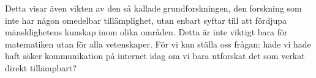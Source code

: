Detta visar även vikten av den så kallade grundforskningen, den forskning som 
inte har någon omedelbar tillämplighet, utan enbart syftar till att fördjupa 
mänsklighetens kunskap inom olika områden.
Detta är inte viktigt bara för matematiken utan för alla vetenskaper.
För vi kan ställa oss frågan: hade vi hade haft säker kommunikation på internet
idag om vi bara utforskat det som verkat direkt tillämpbart?



%
